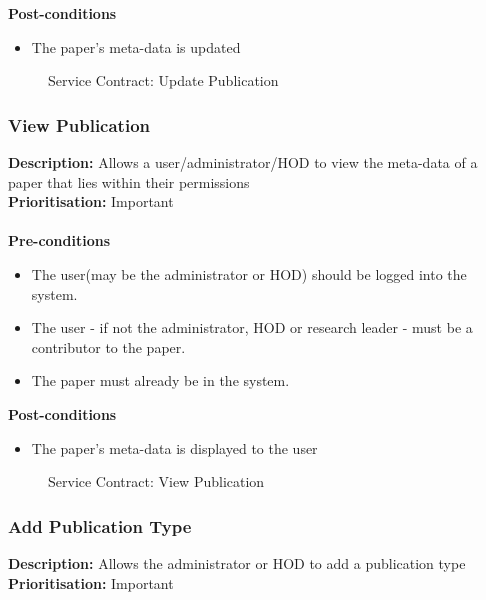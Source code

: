 \documentclass[a4paper]{article}
\begin{document}
	\textbf{Post-conditions}
	\begin{itemize}
		\item The paper's meta-data is updated
	\end{itemize}
	
	\begin{figure}[H]
		\centering
		\caption{Service Contract: Update Publication}
	\end{figure}
	\pagebreak
	\subsubsection{View Publication}
	
	\textbf{Description:} Allows a user/administrator/HOD to view the meta-data of a paper that lies within their permissions\\
	\textbf{Prioritisation:} Important\\
	\\
	
	\textbf{Pre-conditions}
	\begin{itemize}
		\item The user(may be the administrator or HOD) should be logged into the system.
		\item The user - if not the administrator, HOD or research leader - must be a contributor to the paper.
		\item The paper must already be in the system.
	\end{itemize}
	
	\textbf{Post-conditions}
	\begin{itemize}
		\item The paper's meta-data is displayed to the user
	\end{itemize}
	
	\begin{figure}[H]
		\centering
		\caption{Service Contract: View Publication}
	\end{figure}
	
	\pagebreak
	\subsubsection{Add Publication Type}
	
	\textbf{Description:} Allows the administrator or HOD to add a publication type \\
	\textbf{Prioritisation:} Important\\
	\\
	
\end{document}
